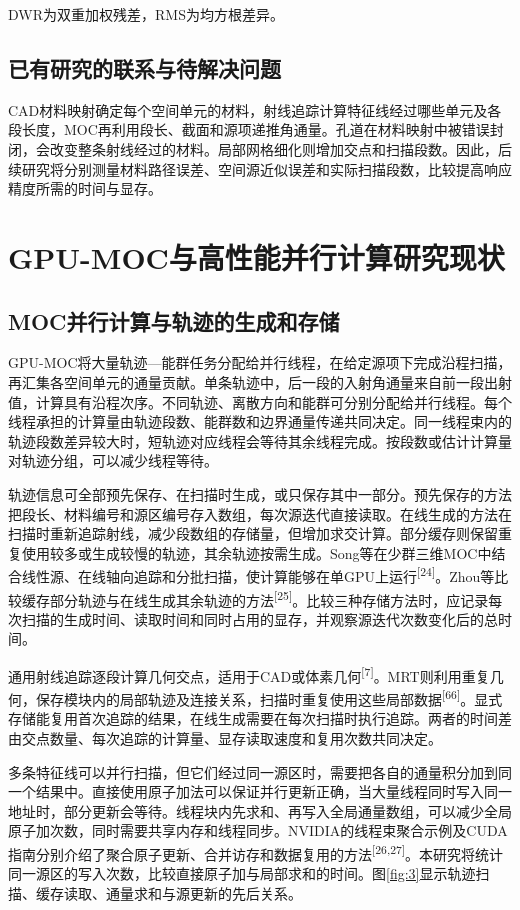 \documentclass[UTF8, zihao=-4, fontset=none, a4paper]{ctexart}
\newcommand{\upcite}[1]{\textsuperscript{[#1]}}
\begin{document}
DWR为双重加权残差，RMS为均方根差异。

\subsection{已有研究的联系与待解决问题}

CAD材料映射确定每个空间单元的材料，射线追踪计算特征线经过哪些单元及各段长度，MOC再利用段长、截面和源项递推角通量。孔道在材料映射中被错误封闭，会改变整条射线经过的材料。局部网格细化则增加交点和扫描段数。因此，后续研究将分别测量材料路径误差、空间源近似误差和实际扫描段数，比较提高响应精度所需的时间与显存。

\section{GPU-MOC与高性能并行计算研究现状}\label{sec:3}

\subsection{MOC并行计算与轨迹的生成和存储}

GPU-MOC将大量轨迹---能群任务分配给并行线程，在给定源项下完成沿程扫描，再汇集各空间单元的通量贡献。单条轨迹中，后一段的入射角通量来自前一段出射值，计算具有沿程次序。不同轨迹、离散方向和能群可分别分配给并行线程。每个线程承担的计算量由轨迹段数、能群数和边界通量传递共同决定。同一线程束内的轨迹段数差异较大时，短轨迹对应线程会等待其余线程完成。按段数或估计计算量对轨迹分组，可以减少线程等待。

轨迹信息可全部预先保存、在扫描时生成，或只保存其中一部分。预先保存的方法把段长、材料编号和源区编号存入数组，每次源迭代直接读取。在线生成的方法在扫描时重新追踪射线，减少段数组的存储量，但增加求交计算。部分缓存则保留重复使用较多或生成较慢的轨迹，其余轨迹按需生成。Song等在少群三维MOC中结合线性源、在线轴向追踪和分批扫描，使计算能够在单GPU上运行\upcite{24}。Zhou等比较缓存部分轨迹与在线生成其余轨迹的方法\upcite{25}。比较三种存储方法时，应记录每次扫描的生成时间、读取时间和同时占用的显存，并观察源迭代次数变化后的总时间。

通用射线追踪逐段计算几何交点，适用于CAD或体素几何\upcite{7}。MRT则利用重复几何，保存模块内的局部轨迹及连接关系，扫描时重复使用这些局部数据\upcite{66}。显式存储能复用首次追踪的结果，在线生成需要在每次扫描时执行追踪。两者的时间差由交点数量、每次追踪的计算量、显存读取速度和复用次数共同决定。

多条特征线可以并行扫描，但它们经过同一源区时，需要把各自的通量积分加到同一个结果中。直接使用原子加法可以保证并行更新正确，当大量线程同时写入同一地址时，部分更新会等待。线程块内先求和、再写入全局通量数组，可以减少全局原子加次数，同时需要共享内存和线程同步。NVIDIA的线程束聚合示例及CUDA指南分别介绍了聚合原子更新、合并访存和数据复用的方法\upcite{26,27}。本研究将统计同一源区的写入次数，比较直接原子加与局部求和的时间。图\ref{fig:3}显示轨迹扫描、缓存读取、通量求和与源更新的先后关系。
\end{document}
